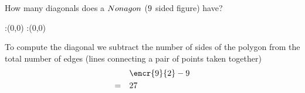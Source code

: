



\question[2] How many diagonals does a $Nonagon$ ($9$ sided figure) have?


\watchout

\ifprintanswers
  \begin{marginfigure}
      :(0,0)
      :(0,0)
    \figdrawbegin{}
      \figdrawline [100,101]
    \figdrawend
    \figvisu{\figBoxA}{}{%
    }
    \centerline{\box\figBoxA}
  \end{marginfigure}
\fi 

\begin{solution}[\mcq]
  To compute the diagonal we subtract the number of sides of the polygon from
  the total number of edges (lines connecting a pair of points taken together)
  \begin{align}
     &\encr{\vbtwo}{2}-\vbtwo \\
    =\quad&\vbthree
  \end{align}

\end{solution}
